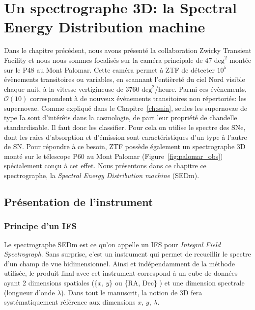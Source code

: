 \documentclass[../main/main.tex]{subfiles}
\begin{document}
\setcounter{chapter}{3}
\chapter{Un spectrographe 3D: la Spectral Energy Distribution machine}\label{ch:sedm}

\minitoc
\vspace{2cm}
Dans le chapitre précédent, nous avons présenté la collaboration Zwicky
Transient Facility et nous nous sommes focalisés sur la caméra
principale de $47\text{ deg}^{2}$ montée sur le P48 au Mont
Palomar. Cette caméra permet à ZTF de détecter $10^{5}$ évènements
transitoires ou variables, en scannant l'entièreté du ciel Nord visible
chaque nuit,  à la vitesse
vertigineuse de $3760\text{ deg}^{2}$/heure. Parmi ces évènements,
$\mathcal{O}(10)$ correspondent à de nouveux évènements transitoires non
répertoriés: les supernovae. Comme expliqué dans le
Chapitre~\ref{ch:snia}, seules les supernovae de type Ia sont
d'intérêts dans la cosmologie, de part leur propriété de chandelle
standardisable. Il faut donc les classifier. Pour cela on utilise le
spectre des SNe, dont les raies d'absorption et d'émission sont caractéristiques d'un
type à l'autre de SN. Pour répondre à ce besoin, ZTF possède également un spectrographe 3D
monté sur le télescope P60 au Mont Palomar
(Figure~\ref{fig:palomar_obs}) spécialement conçu à cet effet. Nous
présentons dans ce chapitre ce spectrographe, la \textit{Spectral Energy
Distribution machine} (SEDm).
\newpage

\section{Présentation de l'instrument}
\label{sec:ifs}

\subsection{Principe d'un IFS}
Le spectrographe SEDm est ce qu'on appelle un IFS pour \textit{Integral Field
Spectrograph}. Sans surprise, c'est un instrument qui permet de
recueillir le spectre d'un champ de vue bidimensionnel.
Ainsi et indépendamment de la méthode utilisée, le produit final avec
cet instrument correspond à
un cube de données ayant 2 dimensions spatiales (\{$x$, $y$\} ou \{RA,
Dec\} ) et une dimension spectrale (longueur d'onde $\lambda$). Dans tout le manuscrit, la notion de 3D fera
systématiquement référence aux dimensions \og $x$, $y$, $\lambda$\fg{}.
\end{document}
